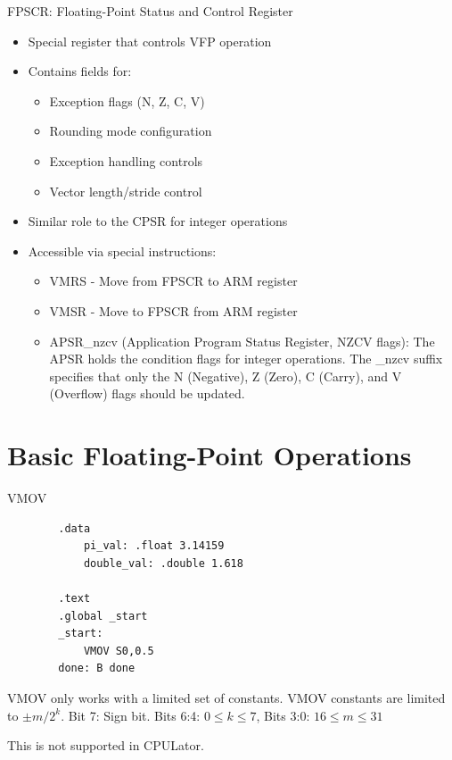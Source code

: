 \documentclass[aspectratio=169]{beamer}
\begin{document}
\begin{frame}{FPSCR: Floating-Point Status and Control Register}
    \begin{itemize}
    \item Special register that controls VFP operation
    \item Contains fields for:
    \begin{itemize}
    \item Exception flags (N, Z, C, V)
    \item Rounding mode configuration
    \item Exception handling controls
    \item Vector length/stride control
    \end{itemize}
    \item Similar role to the CPSR for integer operations
    \item Accessible via special instructions:
    \begin{itemize}
    \item VMRS - Move from FPSCR to ARM register
    \item VMSR - Move to FPSCR from ARM register
    \item APSR\_nzcv (Application Program Status Register, NZCV flags): The APSR holds the condition flags for integer operations. The \_nzcv suffix specifies that only the N (Negative), Z (Zero), C (Carry), and V (Overflow) flags should be updated.
    \end{itemize}
    \end{itemize}
\end{frame}



\section{Basic Floating-Point Operations}
\begin{frame}
    \sectionpage
\end{frame}

\begin{frame}[fragile]{VMOV}

    \begin{verbatim}
        .data
            pi_val: .float 3.14159
            double_val: .double 1.618
        
        .text
        .global _start
        _start:
            VMOV S0,0.5
        done: B done
        \end{verbatim}

VMOV only works with a  limited set of constants. VMOV constants are limited to $\pm m/2^{k}$. Bit 7: Sign bit. Bits 6:4: $0 \leq k \leq 7$, Bits 3:0: $16 \leq m \leq 31$

This is not supported in CPULator.

\end{frame}
\end{document}
